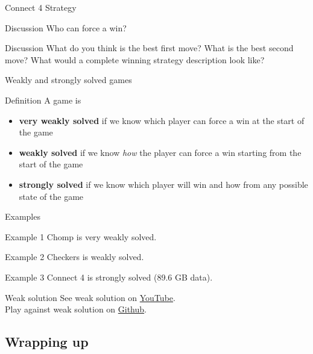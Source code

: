 \documentclass{beamer}
\begin{document}
\begin{frame}{Connect 4 Strategy}
  \begin{block}{Discussion}
	Who can force a win?
  \end{block}
\pause
  \begin{block}{Discussion}
	What do you think is the best first move?  What is
the best second move?  What would a complete winning strategy description look like?
  \end{block}
\end{frame}

\begin{frame}{Weakly and strongly solved games}
  \begin{block}{Definition}
    A game is
    \begin{itemize}
\pause
      \item \textbf{very weakly solved} if we know which player can force a win at the start of the game
\pause
      \item \textbf{weakly solved} if we know \emph{how} the player can force a win starting from the start of the game
\pause
      \item \textbf{strongly solved} if we know which player will win and how from any possible state of the game
    \end{itemize}
  \end{block}
\end{frame}

\begin{frame}{Examples}
\pause
  \begin{block}{Example 1}
    Chomp is very weakly solved.
  \end{block}
\pause
  \begin{block}{Example 2}
    Checkers is weakly solved.
  \end{block}
\pause
  \begin{block}{Example 3}
    Connect 4 is strongly solved (89.6 GB data).
  \end{block}
\end{frame}

\begin{frame}{Weak solution}
  See weak solution on \href{https://www.youtube.com/watch?v=KaljD3Q3ct0}{YouTube}.\\
  Play against weak solution on \href{https://2swap.github.io/WeakC4/?pos=4}{Github}.
\end{frame}

\subsection{Wrapping up}
\end{document}
